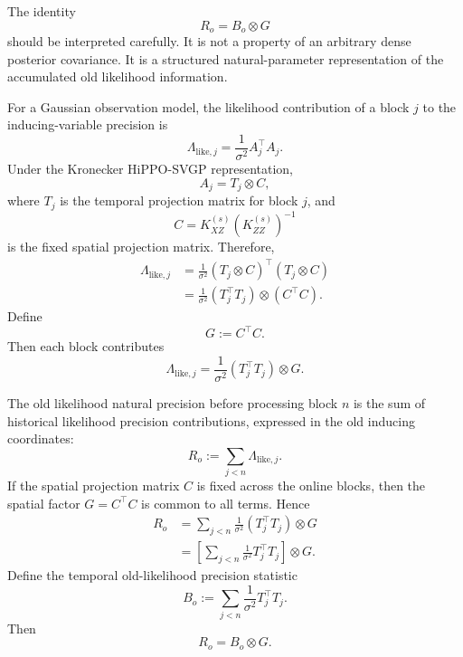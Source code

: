 \documentclass[12pt]{article}
\begin{document}
The identity
\begin{equation}
    R_o=B_o\otimes G
\end{equation}
should be interpreted carefully. It is not a property of an arbitrary
dense posterior covariance. It is a structured natural-parameter
representation of the accumulated old likelihood information.

For a Gaussian observation model, the likelihood contribution of a block
\(j\) to the inducing-variable precision is
\begin{equation}
    \Lambda_{\mathrm{like},j}
    =
    \frac{1}{\sigma^2}A_j^\top A_j.
    \label{eq:app_likelihood_precision}
\end{equation}
Under the Kronecker HiPPO-SVGP representation,
\begin{equation}
    A_j=T_j\otimes C,
    \label{eq:app_Aj_kron}
\end{equation}
where \(T_j\) is the temporal projection matrix for block \(j\), and
\begin{equation}
    C=K_{XZ}^{(s)}\left(K_{ZZ}^{(s)}\right)^{-1}
\end{equation}
is the fixed spatial projection matrix. Therefore,
\begin{align}
    \Lambda_{\mathrm{like},j}
    &=
    \frac{1}{\sigma^2}
    (T_j\otimes C)^\top(T_j\otimes C)                         \\
    &=
    \frac{1}{\sigma^2}
    (T_j^\top T_j)\otimes(C^\top C).
    \label{eq:app_likelihood_precision_kron}
\end{align}
Define
\begin{equation}
    G:=C^\top C.
\end{equation}
Then each block contributes
\begin{equation}
    \Lambda_{\mathrm{like},j}
    =
    \frac{1}{\sigma^2}
    (T_j^\top T_j)\otimes G.
\end{equation}

The old likelihood natural precision before processing block \(n\) is the
sum of historical likelihood precision contributions, expressed in the old
inducing coordinates:
\begin{equation}
    R_o
    :=
    \sum_{j<n}
    \Lambda_{\mathrm{like},j}.
\end{equation}
If the spatial projection matrix \(C\) is fixed across the online blocks,
then the spatial factor \(G=C^\top C\) is common to all terms. Hence
\begin{align}
    R_o
    &=
    \sum_{j<n}
    \frac{1}{\sigma^2}
    (T_j^\top T_j)\otimes G                                  \\
    &=
    \left[
        \sum_{j<n}
        \frac{1}{\sigma^2}
        T_j^\top T_j
    \right]\otimes G.
\end{align}
Define the temporal old-likelihood precision statistic
\begin{equation}
    B_o
    :=
    \sum_{j<n}
    \frac{1}{\sigma^2}
    T_j^\top T_j.
    \label{eq:app_Bo_definition}
\end{equation}
Then
\begin{equation}
    R_o=B_o\otimes G.
    \label{eq:app_Ro_Bo_G}
\end{equation}
\end{document}
